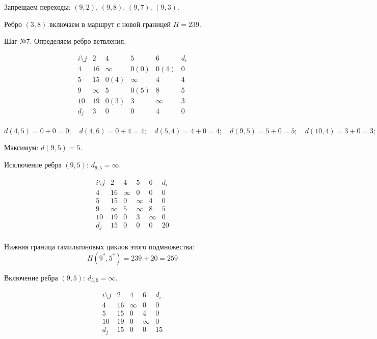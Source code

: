 \documentclass{article}
\begin{document}
Запрещаем переходы: $(9,2)$, $(9,8)$, $(9,7)$, $(9,3)$.

Ребро $(3,8)$ включаем в маршрут с новой границей $H=239$.

Шаг №7.
Определяем ребро ветвления.

\[
    \begin{array}{c|cccc|c}
        i \setminus j & 2      & 4      & 5      & 6      & d_i \\
        \hline
        4             & 16     & \infty & 0(0)   & 0(4)   & 0   \\
        5             & 15     & 0(4)   & \infty & 4      & 4   \\
        9             & \infty & 5      & 0(5)   & 8      & 5   \\
        10            & 19     & 0(3)   & 3      & \infty & 3   \\
        \hline
        d_j           & 3      & 0      & 0      & 4      & 0   \\
    \end{array}
\]

\[
    d(4,5) = 0 + 0 = 0; \quad d(4,6) = 0 + 4 = 4; \quad d(5,4) = 4 + 0 = 4; \quad d(9,5) = 5 + 0 = 5; \quad d(10,4) = 3 + 0 = 3;
\]

Максимум: $d(9,5)=5$.

Исключение ребра $(9,5)$: $d_{9,5}=\infty$.

\[
    \begin{array}{c|cccc|c}
        i \setminus j & 2      & 4      & 5      & 6      & d_i \\
        \hline
        4             & 16     & \infty & 0      & 0      & 0   \\
        5             & 15     & 0      & \infty & 4      & 0   \\
        9             & \infty & 5      & \infty & 8      & 5   \\
        10            & 19     & 0      & 3      & \infty & 0   \\
        \hline
        d_j           & 15     & 0      & 0      & 0      & 20  \\
    \end{array}
\]

Нижняя граница гамильтоновых циклов этого подмножества:
\[
    H(9^*,5^*) = 239 + 20 = 259
\]

Включение ребра $(9,5)$: $d_{5,9}=\infty$.

\[
    \begin{array}{c|ccc|c}
        i \setminus j & 2  & 4      & 6      & d_i \\
        \hline
        4             & 16 & \infty & 0      & 0   \\
        5             & 15 & 0      & 4      & 0   \\
        10            & 19 & 0      & \infty & 0   \\
        \hline
        d_j           & 15 & 0      & 0      & 15  \\
    \end{array}
\]
\end{document}
